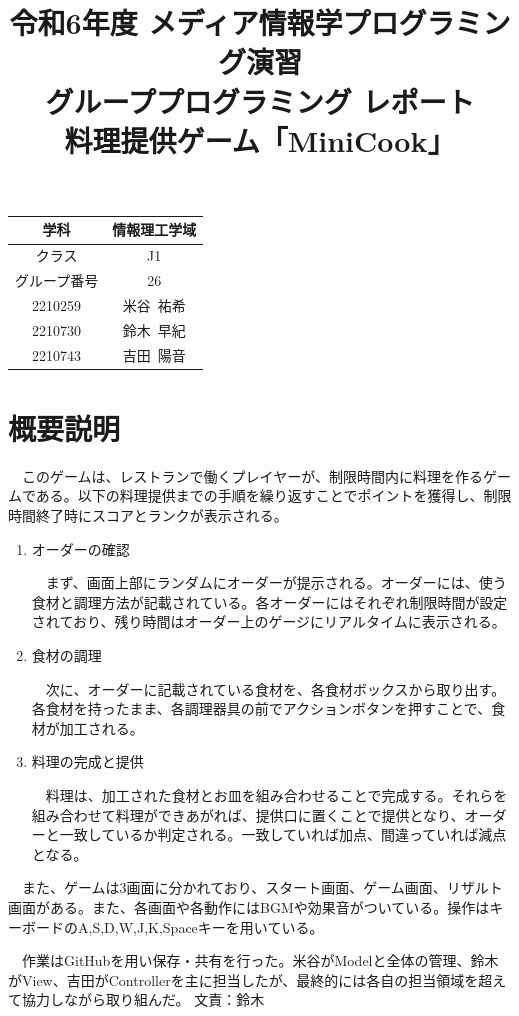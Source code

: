 \documentclass[a4j]{jsarticle} %
\title{令和6年度 メディア情報学プログラミング演習\\グループプログラミング レポート\\料理提供ゲーム「MiniCook」}
\begin{document}
\maketitle

\begin{center}%
  \begin{tabular}{|c||c|}
      \hline
      学科&情報理工学域\\
      \hline
      クラス&J1\\
      \hline
      グループ番号&26\\
      \hline
      2210259&米谷~祐希\\
      \hline
      2210730&鈴木~早紀\\
      \hline
      2210743&吉田~陽音\\
      \hline
  \end{tabular}
\end{center}

\newpage

\section{概要説明}
　このゲームは、レストランで働くプレイヤーが、制限時間内に料理を作るゲームである。以下の料理提供までの手順を繰り返すことでポイントを獲得し、制限時間終了時にスコアとランクが表示される。
\begin{enumerate}
  \item オーダーの確認\par
  　まず、画面上部にランダムにオーダーが提示される。オーダーには、使う食材と調理方法が記載されている。各オーダーにはそれぞれ制限時間が設定されており、残り時間はオーダー上のゲージにリアルタイムに表示される。
  \item 食材の調理\par
  　次に、オーダーに記載されている食材を、各食材ボックスから取り出す。各食材を持ったまま、各調理器具の前でアクションボタンを押すことで、食材が加工される。
  \item 料理の完成と提供\par
  　料理は、加工された食材とお皿を組み合わせることで完成する。それらを組み合わせて料理ができあがれば、提供口に置くことで提供となり、オーダーと一致しているか判定される。一致していれば加点、間違っていれば減点となる。   
\end{enumerate}
　また、ゲームは3画面に分かれており、スタート画面、ゲーム画面、リザルト画面がある。また、各画面や各動作にはBGMや効果音がついている。操作はキーボードのA,S,D,W,J,K,Spaceキーを用いている。\par
　作業はGitHubを用い保存・共有を行った。米谷がModelと全体の管理、鈴木がView、吉田がControllerを主に担当したが、最終的には各自の担当領域を超えて協力しながら取り組んだ。
文責：鈴木
\end{document}
